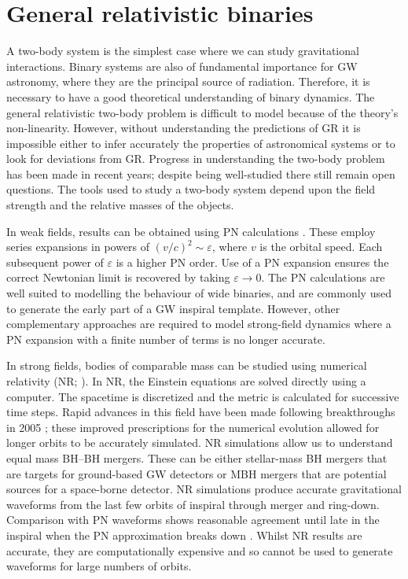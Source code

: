 \section{General relativistic binaries}\label{sec:two-body}

A two-body system is the simplest case where we can study gravitational interactions. Binary systems are also of fundamental importance for GW astronomy, where they are the principal source of radiation. Therefore, it is necessary to have a good theoretical understanding of binary dynamics. The general relativistic two-body problem is difficult to model because of the theory's non-linearity. However, without understanding the predictions of GR it is impossible either to infer accurately the properties of astronomical systems or to look for deviations from GR. Progress in understanding the two-body problem has been made in recent years; despite being well-studied there still remain open questions. The tools used to study a two-body system depend upon the field strength and the relative masses of the objects.

In weak fields, results can be obtained using PN calculations \citep{Blanchet2006}. These employ series expansions in powers of  $(v/c)^2 \sim \varepsilon$, where $v$ is the orbital speed. Each subsequent power of $\varepsilon$ is a higher PN order. Use of a PN expansion ensures the correct Newtonian limit is recovered by taking $\varepsilon \rightarrow 0$. The PN calculations are well suited to modelling the behaviour of wide binaries, and are commonly used to generate the early part of a GW inspiral template. However, other complementary approaches are required to model strong-field dynamics where a PN expansion with a finite number of terms is no longer accurate.

In strong fields, bodies of comparable mass can be studied using numerical relativity (NR; \citealt{Centrella2010,Pfeiffer2012,Sperhake2013}). In NR, the Einstein equations are solved directly using a computer. The spacetime is discretized and the metric is calculated for successive time steps. Rapid advances in this field have been made following breakthroughs in 2005 \citep{Pretorius2005,Campanelli2006,Baker2006}; these improved prescriptions for the numerical evolution allowed for longer orbits to be accurately simulated. NR simulations allow us to understand equal mass BH--BH mergers. These can be either stellar-mass BH mergers that are targets for ground-based GW detectors or MBH mergers that are potential sources for a space-borne detector. NR simulations produce accurate gravitational waveforms from the last few orbits of inspiral through merger and ring-down. Comparison with PN waveforms shows reasonable agreement until late in the inspiral when the PN approximation breaks down \citep[e.g.,][]{Baker2007,Buonanno2007}. Whilst NR results are accurate, they are computationally expensive and so cannot be used to generate waveforms for large numbers of orbits.

